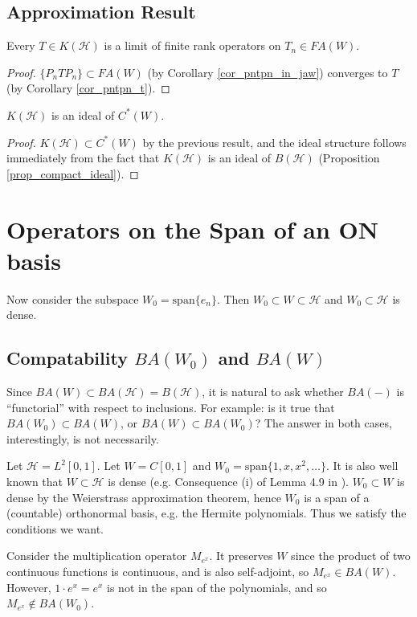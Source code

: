 \documentclass[12pt]{article}
\begin{document}

\subsection{Approximation Result} %

\begin{corollary}
	Every $T\in K(\mathcal{H})$ is a limit of finite rank operators on $T_n\in FA(W)$.
\end{corollary}
\begin{proof}
	$\{P_nTP_n \}\subset FA(W)$ (by Corollary \ref{cor_pntpn_in_jaw}) converges to $T$ (by Corollary \ref{cor_pntpn_t}).
\end{proof}

\begin{proposition}
	$K(\mathcal{H})$ is an ideal of $C^\ast(W)$. 
\end{proposition}
\begin{proof}
	$K(\mathcal{H})\subset C^\ast(W)$ by the previous result, and the ideal structure follows immediately from the fact that $K(\mathcal{H})$ is an ideal of $B(\mathcal{H})$ (Proposition \ref{prop_compact_ideal}). 
\end{proof}



\section{Operators on the Span of an ON basis} %

Now consider the subspace $W_0=\text{span}\{e_n\}$. Then $W_0\subset W\subset\mathcal{H}$ and $W_0\subset\mathcal{H}$ is dense.

\subsection{Compatability $BA(W_0)$ and $BA(W)$} %

Since $BA(W)\subset BA(\mathcal{H})=B(\mathcal{H})$, it is natural to ask whether $BA(-)$ is ``functorial'' with respect to inclusions. For example: is it true that $BA(W_0)\subset BA(W)$, or $BA(W)\subset BA(W_0)$? The answer in both cases, interestingly, is not necessarily.

\begin{example}
	Let $\mathcal{H}=L^2[0,1]$. Let $W=C[0,1]$ and $W_0=\text{span}\{1, x, x^2, \dots\}$. It is also well known that $W\subset\mathcal{H}$ is dense (e.g. Consequence (i) of Lemma 4.9 in \cite{legall_2022}). $W_0\subset W$ is dense by the Weierstrass approximation theorem, hence $W_0$ is a span of a (countable) orthonormal basis, e.g. the Hermite polynomials. Thus we satisfy the conditions we want.

	Consider the multiplication operator $M_{e^x}$. It preserves $W$ since the product of two continuous functions is continuous, and is also self-adjoint, so $M_{e^x}\in BA(W)$. However, $1\cdot e^x = e^x$ is not in the span of the polynomials, and so $M_{e^x}\not\in BA(W_0)$.
\end{example}
\end{document}
